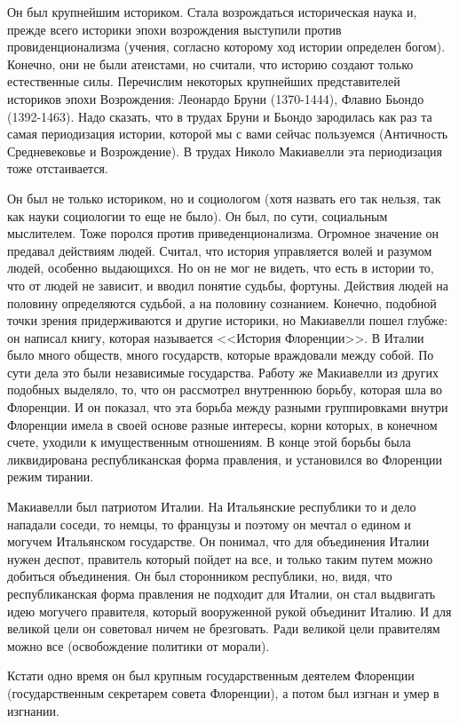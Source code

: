 Он был крупнейшим историком. Стала возрождаться историческая наука и, прежде всего историки эпохи возрождения выступили против провиденционализма (учения, согласно которому ход истории определен богом). Конечно, они не были атеистами, но считали, что историю создают только естественные силы. Перечислим некоторых крупнейших представителей историков эпохи Возрождения: Леонардо Бруни (1370-1444), Флавио Бьондо (1392-1463). Надо сказать, что в трудах Бруни и Бьондо зародилась как раз та самая периодизация истории, которой мы с вами сейчас пользуемся (Античность Средневековье и Возрождение). В трудах Николо Макиавелли эта периодизация тоже отстаивается.

Он был не только историком, но и социологом (хотя назвать его так нельзя, так как науки социологии то еще не было). Он был, по сути, социальным мыслителем. Тоже поролся против приведенционализма. Огромное значение он предавал действиям людей. Считал, что история управляется волей и разумом людей, особенно выдающихся. Но он не мог не видеть, что есть в истории то, что от людей не зависит, и вводил понятие судьбы, фортуны. Действия людей на половину определяются судьбой, а на половину сознанием. Конечно, подобной точки зрения придерживаются и другие историки, но Макиавелли пошел глубже: он написал книгу, которая называется <<История Флоренции>>. В Италии было много обществ, много государств, которые враждовали между собой. По сути дела это были независимые государства. Работу же Макиавелли из других подобных выделяло, то, что он рассмотрел внутреннюю борьбу, которая шла во Флоренции. И он показал, что эта борьба между разными группировками внутри Флоренции имела в своей основе разные интересы, корни которых, в конечном счете, уходили к имущественным отношениям. В конце этой борьбы была ликвидирована республиканская форма правления, и установился во Флоренции режим тирании.

Макиавелли был патриотом Италии. На Итальянские республики то и дело нападали соседи, то немцы, то французы и поэтому он мечтал о едином и могучем Итальянском государстве. Он понимал, что для объединения Италии нужен деспот, правитель который пойдет на все, и только таким путем можно добиться объединения. Он был сторонником республики, но, видя, что республиканская форма правления не подходит для Италии, он стал выдвигать идею могучего правителя, который вооруженной рукой объединит Италию. И для великой цели он советовал ничем не брезговать. Ради великой цели правителям можно все (освобождение политики от морали).

Кстати одно время он был крупным государственным деятелем Флоренции (государственным секретарем совета Флоренции), а потом был изгнан и умер в изгнании.

